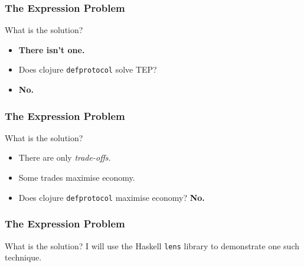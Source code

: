 \begin{frame}[fragile]
\frametitle{The Expression Problem}
\begin{block}{What is the solution?}
\begin{itemize}
\item<1-> \textbf{There isn't one.}
\item<2-> Does clojure \lstinline{defprotocol} solve TEP?
\item<3-> \textbf{No.} 
\end{itemize}
\end{block}
\end{frame}

\begin{frame}[fragile]
\frametitle{The Expression Problem}
\begin{block}{What is the solution?}
\begin{itemize}
\item<1-> There are only \emph{trade-offs.}
\item<2-> Some trades maximise economy. 
\item<3-> Does clojure \lstinline{defprotocol} maximise economy? \textbf{No.}
\end{itemize}
\end{block}
\end{frame}

\begin{frame}[fragile]
\frametitle{The Expression Problem}
\begin{block}{What is the solution?}
I will use the Haskell \lstinline{lens} library to demonstrate one such technique. 
\end{block}
\end{frame}
